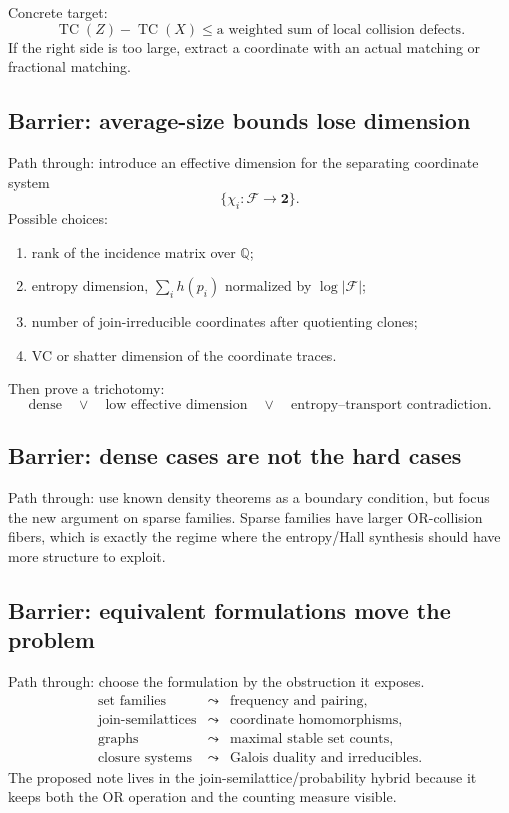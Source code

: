 \documentclass[11pt]{article}
\DeclareMathOperator{\TC}{TC}
\begin{document}
Concrete target:
\[
  \TC(Z)-\TC(X)
  \leq
  \text{a weighted sum of local collision defects}.
\]
If the right side is too large, extract a coordinate with an actual matching
or fractional matching.

\subsection{Barrier: average-size bounds lose dimension}

Path through: introduce an effective dimension for the separating coordinate
system
\[
  \{\chi_i:\mathcal{F}\to\mathbf{2}\}.
\]
Possible choices:
\begin{enumerate}[label=(\roman*)]
  \item rank of the incidence matrix over $\mathbb{Q}$;
  \item entropy dimension, $\sum_i h(p_i)$ normalized by $\log|\mathcal{F}|$;
  \item number of join-irreducible coordinates after quotienting clones;
  \item VC or shatter dimension of the coordinate traces.
\end{enumerate}
Then prove a trichotomy:
\[
  \text{dense} \quad \vee \quad
  \text{low effective dimension} \quad \vee \quad
  \text{entropy--transport contradiction}.
\]

\subsection{Barrier: dense cases are not the hard cases}

Path through: use known density theorems as a boundary condition, but focus
the new argument on sparse families.  Sparse families have larger OR-collision
fibers, which is exactly the regime where the entropy/Hall synthesis should
have more structure to exploit.

\subsection{Barrier: equivalent formulations move the problem}

Path through: choose the formulation by the obstruction it exposes.
\[
\begin{array}{ccl}
\text{set families} &\leadsto& \text{frequency and pairing},\\
\text{join-semilattices} &\leadsto& \text{coordinate homomorphisms},\\
\text{graphs} &\leadsto& \text{maximal stable set counts},\\
\text{closure systems} &\leadsto& \text{Galois duality and irreducibles}.
\end{array}
\]
The proposed note lives in the join-semilattice/probability hybrid because it
keeps both the OR operation and the counting measure visible.
\end{document}
